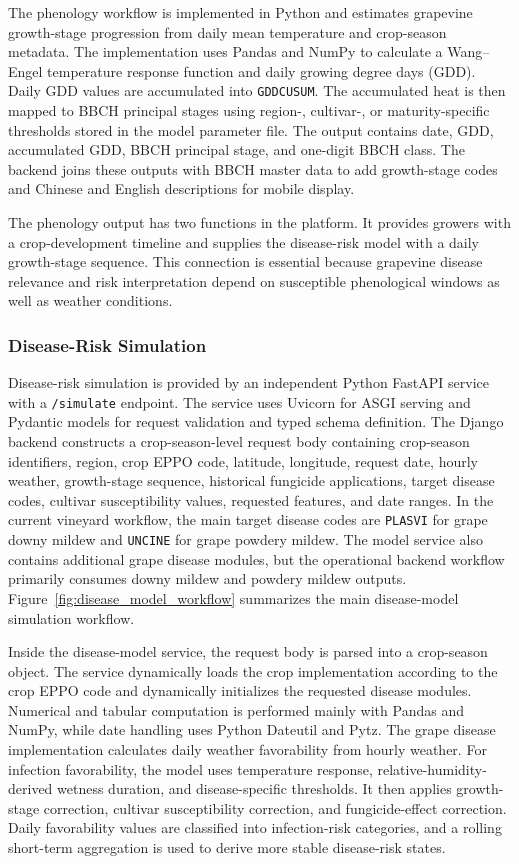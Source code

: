 \documentclass[11pt,a4paper]{article}
\begin{document}
The phenology workflow is implemented in Python and estimates grapevine growth-stage progression from daily mean temperature and crop-season metadata. The implementation uses Pandas and NumPy to calculate a Wang--Engel temperature response function and daily growing degree days (GDD). Daily GDD values are accumulated into \texttt{GDDCUSUM}. The accumulated heat is then mapped to BBCH principal stages using region-, cultivar-, or maturity-specific thresholds stored in the model parameter file. The output contains date, GDD, accumulated GDD, BBCH principal stage, and one-digit BBCH class. The backend joins these outputs with BBCH master data to add growth-stage codes and Chinese and English descriptions for mobile display.

The phenology output has two functions in the platform. It provides growers with a crop-development timeline and supplies the disease-risk model with a daily growth-stage sequence. This connection is essential because grapevine disease relevance and risk interpretation depend on susceptible phenological windows as well as weather conditions.

\subsubsection{Disease-Risk Simulation}

Disease-risk simulation is provided by an independent Python FastAPI service with a \texttt{/simulate} endpoint. The service uses Uvicorn for ASGI serving and Pydantic models for request validation and typed schema definition. The Django backend constructs a crop-season-level request body containing crop-season identifiers, region, crop EPPO code, latitude, longitude, request date, hourly weather, growth-stage sequence, historical fungicide applications, target disease codes, cultivar susceptibility values, requested features, and date ranges. In the current vineyard workflow, the main target disease codes are \texttt{PLASVI} for grape downy mildew and \texttt{UNCINE} for grape powdery mildew. The model service also contains additional grape disease modules, but the operational backend workflow primarily consumes downy mildew and powdery mildew outputs. Figure~\ref{fig:disease_model_workflow} summarizes the main disease-model simulation workflow.

Inside the disease-model service, the request body is parsed into a crop-season object. The service dynamically loads the crop implementation according to the crop EPPO code and dynamically initializes the requested disease modules. Numerical and tabular computation is performed mainly with Pandas and NumPy, while date handling uses Python Dateutil and Pytz. The grape disease implementation calculates daily weather favorability from hourly weather. For infection favorability, the model uses temperature response, relative-humidity-derived wetness duration, and disease-specific thresholds. It then applies growth-stage correction, cultivar susceptibility correction, and fungicide-effect correction. Daily favorability values are classified into infection-risk categories, and a rolling short-term aggregation is used to derive more stable disease-risk states.
\end{document}

